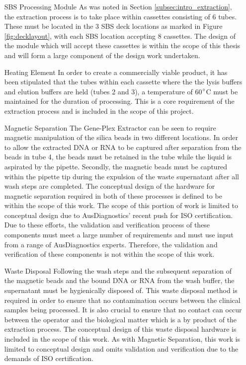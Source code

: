 \begin{enumerate}
	\item [SBS Processing Module] As was noted in Section \ref{subsec:intro_extraction}, the extraction process is to take place within cassettes consisting of 6 tubes. These must be located in the 3 SBS deck locations as marked in Figure \ref{fig:decklayout}, with each SBS location accepting 8 cassettes. The design of the module which will accept these cassettes is within the scope of this thesis and will form a large component of the design work undertaken.

	\item [Heating Element] In order to create a commercially viable product, it has been stipulated that the tubes within each cassette where the the lysis buffers and elution buffers are held (tubes 2 and 3), a temperature of 60$\degree$C must be maintained for the duration of processing. This is a core requirement of the extraction process and is included in the scope of this project.
	

	\item [Magnetic Separation] The Gene-Plex Extractor can be seen to require magnetic manipulation of the silica beads in two different locations. In order to allow the extracted DNA or RNA to be captured after separation from the beads in tube 4, the beads must be retained in the tube while the liquid is aspirated by the pipette. Secondly, the magnetic beads must be captured within the pipette tip during the expulsion of the waste supernatant after all wash steps are completed. The conceptual design of the hardware for magnetic separation required in both of these processes is defined to be within the scope of this work. The scope of this portion of work is limited to conceptual design due to AusDiagnostics' recent push for ISO certification. Due to these efforts, the validation and verification process of these components must meet a large number of requirements and must use input from a range of AusDiagnostics experts. Therefore, the validation and verification of these components is not within the scope of this work.

	\item [Waste Disposal] Following the wash steps and the subsequent separation of the magnetic beads and the bound DNA or RNA from the wash buffer, the supernatant must be hygienically disposed of. This waste disposal method is required in order to ensure that no contamination occurs between the clinical samples being processed. It is also crucial to ensure that no contact can occur between the operator and the biological matter which is a by product of the extraction process. The conceptual design of this waste disposal hardware is included in the scope of this work. As with Magnetic Separation, this work is limited to conceptual design and omits validation and verification due to the demands of ISO certification.
	
\end{enumerate}

